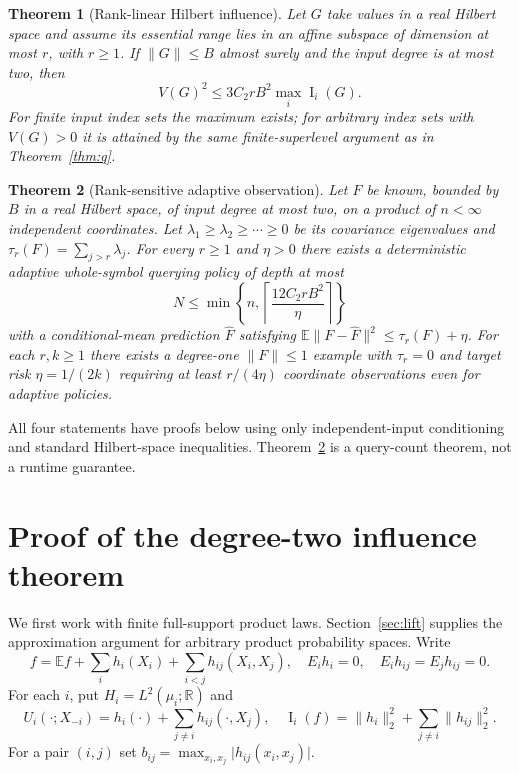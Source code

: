 \documentclass[11pt,letterpaper]{article}
\newtheorem{theorem}{Theorem}[section]
\theoremstyle{definition}
\newcommand{\E}{\mathbb E}
\newcommand{\Inf}{\operatorname{I}}
\newcommand{\abs}[1]{\lvert #1\rvert}
\newcommand{\norm}[1]{\lVert #1\rVert}
\begin{document}
\begin{theorem}[Rank-linear Hilbert influence]\label{thm:r}
Let $G$ take values in a real Hilbert space and assume its essential range
lies in an affine subspace of dimension at most $r$, with $r\ge1$.
If $\norm{G}\le B$ almost surely and the input degree is at most two, then
\begin{equation}\label{eq:R}
\boxed{V(G)^2\le 3C_2rB^2\max_i\Inf_i(G).}
\end{equation}
For finite input index sets the maximum exists; for arbitrary index sets
with $V(G)>0$ it is attained by the same finite-superlevel argument as in
Theorem~\ref{thm:q}.
\end{theorem}
\begin{theorem}[Rank-sensitive adaptive observation]\label{thm:obs}
Let $F$ be known, bounded by $B$ in a real Hilbert space, of input degree
at most two, on a product of $n<\infty$ independent coordinates. Let
$\lambda_1\ge\lambda_2\ge\cdots\ge0$ be its covariance eigenvalues and
$\tau_r(F)=\sum_{j>r}\lambda_j$. For every $r\ge1$ and $\eta>0$ there
exists a deterministic adaptive whole-symbol querying policy of depth at most
\begin{equation}\label{eq:depth}
N\le\min\left\{n,\left\lceil\frac{12C_2rB^2}{\eta}\right\rceil\right\}
\end{equation}
with a conditional-mean prediction $\widehat F$ satisfying
$\E\norm{F-\widehat F}^2\le\tau_r(F)+\eta$.
For each $r,k\ge1$ there exists a degree-one $\norm F\le1$ example
with $\tau_r=0$ and target risk $\eta=1/(2k)$ requiring at least
$r/(4\eta)$ coordinate observations even for adaptive policies.
\end{theorem}
\noindent All four statements have proofs below using only independent-input
conditioning and standard Hilbert-space inequalities. Theorem~\ref{thm:obs}
is a query-count theorem, not a runtime guarantee.

\section{Proof of the degree-two influence theorem}\label{sec:quad}
We first work with finite full-support product laws. Section~\ref{sec:lift} supplies the approximation argument for arbitrary product probability spaces. Write
\begin{equation}\label{eq:dec}
f=\E f+\sum_i h_i(X_i)+\sum_{i<j}h_{ij}(X_i,X_j),\quad
E_i h_i=0,\quad E_i h_{ij}=E_jh_{ij}=0.
\end{equation}
For each $i$, put $H_i=L^2(\mu_i;\mathbb R)$ and
\begin{equation}\label{eq:ui}
U_i(\cdot;X_{-i})=h_i(\cdot)+\sum_{j\ne i}h_{ij}(\cdot,X_j),\quad
\Inf_i(f)=\norm{h_i}_2^2+\sum_{j\ne i}\norm{h_{ij}}_2^2.
\end{equation}
For a pair $(i,j)$ set $b_{ij}=\max_{x_i,x_j}\abs{h_{ij}(x_i,x_j)}$.
\end{document}
